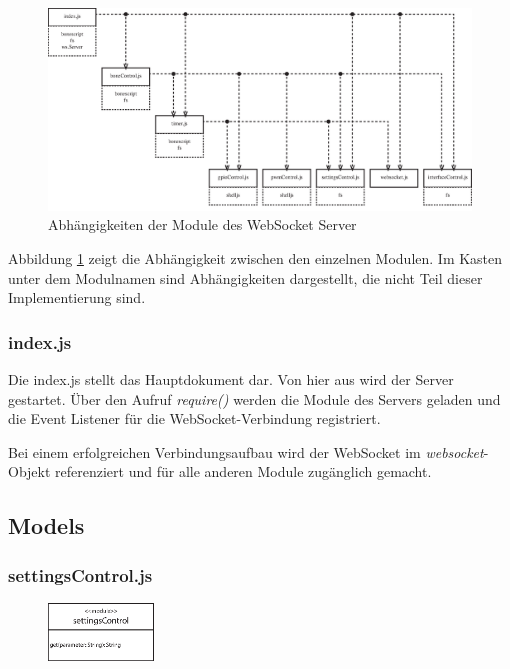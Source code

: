 \begin{figure}[ht]
\centering
\includegraphics[width = \textwidth]{documentation/images/wssDependencies.eps}
\caption{Abhängigkeiten der Module des WebSocket Server}
\label{fig:wssDependencies}
\end{figure}

Abbildung \ref{fig:wssDependencies} zeigt die Abhängigkeit zwischen den einzelnen Modulen. Im Kasten unter dem Modulnamen sind Abhängigkeiten dargestellt, die nicht Teil dieser Implementierung sind.


\subsubsection{index.js}
Die index.js stellt das Hauptdokument dar. Von hier aus wird der Server gestartet. Über den Aufruf \textit{require()} werden die Module des Servers geladen und die Event Listener für die WebSocket-Verbindung registriert.

Bei einem erfolgreichen Verbindungsaufbau wird der WebSocket im \textit{websocket}-Objekt referenziert und für alle anderen Module zugänglich gemacht.


\subsection{Models}

\subsubsection{settingsControl.js}
\begin{figure}
\vspace{-14pt}
\centering
\includegraphics[width = 0.25\textwidth]{documentation/images/apiSettingsControl.eps}
\end{figure}

